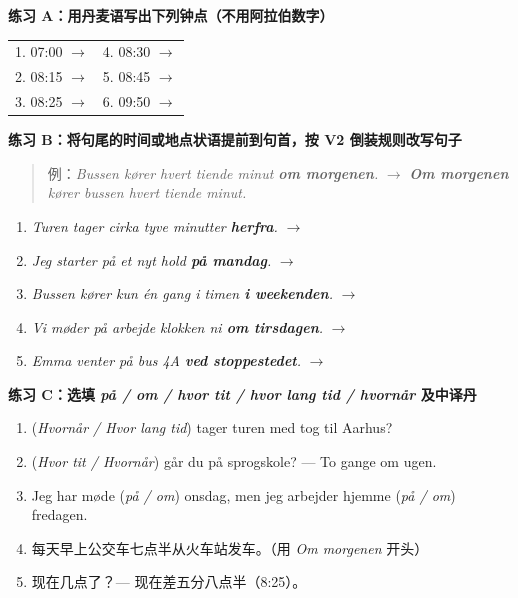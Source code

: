 
\textbf{练习 A：用丹麦语写出下列钟点（不用阿拉伯数字）}\\[0.3em]
\begin{tabularx}{\linewidth}{@{} X X @{}}
1. 07:00 $\rightarrow$ \underline{\hspace{4.2cm}} & 4. 08:30 $\rightarrow$ \underline{\hspace{4.2cm}} \\
2. 08:15 $\rightarrow$ \underline{\hspace{4.2cm}} & 5. 08:45 $\rightarrow$ \underline{\hspace{4.2cm}} \\
3. 08:25 $\rightarrow$ \underline{\hspace{4.2cm}} & 6. 09:50 $\rightarrow$ \underline{\hspace{4.2cm}} \\
\end{tabularx}
\vspace{0.3em}

\textbf{练习 B：将句尾的时间或地点状语提前到句首，按 V2 倒装规则改写句子}
\begin{quote}
\small 例：\textit{Bussen kører hvert tiende minut \textbf{om morgenen}.} $\rightarrow$ \textit{\textbf{Om morgenen} kører bussen hvert tiende minut.}
\end{quote}
\begin{enumerate}
  \item \textit{Turen tager cirka tyve minutter \textbf{herfra}.} $\rightarrow$
  \item \textit{Jeg starter på et nyt hold \textbf{på mandag}.} $\rightarrow$
  \item \textit{Bussen kører kun én gang i timen \textbf{i weekenden}.} $\rightarrow$
  \item \textit{Vi møder på arbejde klokken ni \textbf{om tirsdagen}.} $\rightarrow$
  \item \textit{Emma venter på bus 4A \textbf{ved stoppestedet}.} $\rightarrow$
\end{enumerate}

\textbf{练习 C：选填 \textit{på / om / hvor tit / hvor lang tid / hvornår} 及中译丹}
\begin{enumerate}
  \item \underline{\hspace{2.8cm}} (\textit{Hvornår / Hvor lang tid}) tager turen med tog til Aarhus?
  \item \underline{\hspace{2.8cm}} (\textit{Hvor tit / Hvornår}) går du på sprogskole? --- To gange om ugen.
  \item Jeg har møde \underline{\hspace{1.2cm}} (\textit{på / om}) onsdag, men jeg arbejder hjemme \underline{\hspace{1.2cm}} (\textit{på / om}) fredagen.
  \item 每天早上公交车七点半从火车站发车。（用 \textit{Om morgenen} 开头）
  \item 现在几点了？--- 现在差五分八点半（8:25）。
\end{enumerate}


